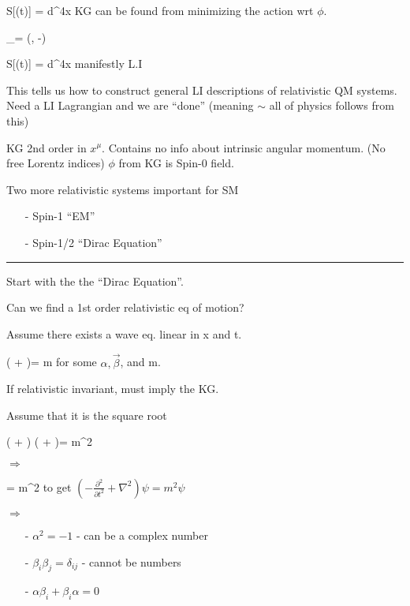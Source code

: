 {\be
S[\phi(t)] = \int d^4x 
\ee
KG can be found from minimizing the action wrt $\phi$.


\be
\partial_\mu = (, -\vec{\nabla})
\ee

\be
S[\phi(t)] = \int d^4x 
\ee
manifestly L.I


This tells us how to construct general LI descriptions of relativistic QM systems.
Need a LI Lagrangian and we are ``done'' (meaning $\sim$ all of physics follows from this) 

KG 2nd order in $x^\mu$.  
Contains no info about intrinsic angular momentum. (No free Lorentz indices)
$\phi$ from KG is Spin-0 field.

\begin{tcolorbox}
Two more relativistic systems important for SM
\begin{itemize}
\item[-] Spin-1 ``EM''
\item[-] Spin-1/2 ``Dirac Equation''
\end{itemize}
\end{tcolorbox}


\noindent\rule{\textwidth}{1pt}
Start with the the ``Dirac Equation''.

Can we find a 1st order relativistic eq of motion?

Assume there exists a wave eq. linear in x and t.

\be
\left(\alpha {} + \vec{\beta}\vec{\nabla}   \right)\psi = m\psi
\ee
for some $\alpha, \vec{\beta}$, and m. 

If relativistic invariant, must imply the KG. 

Assume that it is the square root

\be
\left(\alpha {} + \vec{\beta}\vec{\nabla}   \right) \left(\alpha {} + \vec{\beta}\vec{\nabla}   \right)\psi = m^2\psi
\ee

$\Rightarrow$

\be
{} \psi = m^2 \psi
\ee
to get $(-\frac{\partial^2}{\partial t^2} + \nabla^2)\psi = m^2 \psi$

$\Rightarrow$

\begin{itemize}        
\item[-] $\alpha^2 = -1$ - can be a complex number 
\item[-] $\beta_i\beta_j = \delta_{ij}$ - cannot be numbers
\item[-] $\alpha\beta_i + \beta_i\alpha = 0$
\end{itemize}        

}
